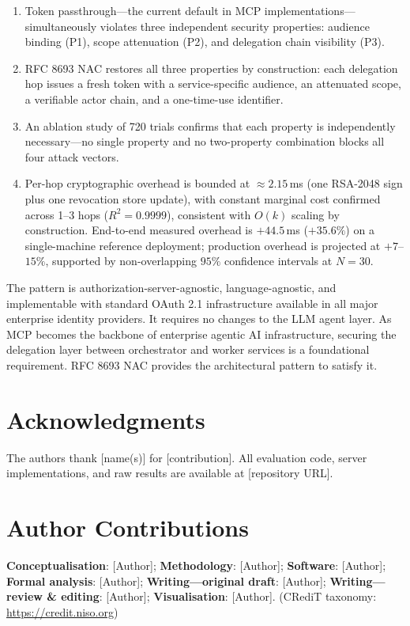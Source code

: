 \documentclass[journal]{IEEEtran}
\begin{document}
\begin{enumerate}
  \item Token passthrough---the current default in MCP implementations---
        simultaneously violates three independent security properties: audience
        binding (P1), scope attenuation (P2), and delegation chain visibility
        (P3).
  \item RFC 8693 NAC restores all three properties by construction: each
        delegation hop issues a fresh token with a service-specific audience,
        an attenuated scope, a verifiable actor chain, and a one-time-use
        identifier.
  \item An ablation study of 720 trials confirms that each property is
        independently necessary---no single property and no two-property
        combination blocks all four attack vectors.
  \item Per-hop cryptographic overhead is bounded at $\approx 2.15$\,ms
        (one RSA-2048 sign plus one revocation store update), with constant
        marginal cost confirmed across 1--3 hops ($R^2 = 0.9999$), consistent
        with $O(k)$ scaling by construction. End-to-end measured overhead is
        $+44.5$\,ms ($+35.6\%$) on a single-machine reference deployment;
        production overhead is projected at $+7$--$15\%$, supported by
        non-overlapping $95\%$ confidence intervals at $N=30$.
\end{enumerate}

The pattern is authorization-server-agnostic, language-agnostic, and
implementable with standard OAuth 2.1 infrastructure available in all major
enterprise identity providers. It requires no changes to the LLM agent layer.
As MCP becomes the backbone of enterprise agentic AI infrastructure, securing
the delegation layer between orchestrator and worker services is a foundational
requirement. RFC 8693 NAC provides the architectural pattern to satisfy it.

\FloatBarrier  %

\section*{Acknowledgments}
The authors thank [name(s)] for [contribution]. All evaluation code, server
implementations, and raw results are available at [repository URL].

\section*{Author Contributions}
\textbf{Conceptualisation}: [Author]; \textbf{Methodology}: [Author];
\textbf{Software}: [Author]; \textbf{Formal analysis}: [Author];
\textbf{Writing---original draft}: [Author];
\textbf{Writing---review \& editing}: [Author];
\textbf{Visualisation}: [Author].
(CRediT taxonomy: \url{https://credit.niso.org})
\end{document}
